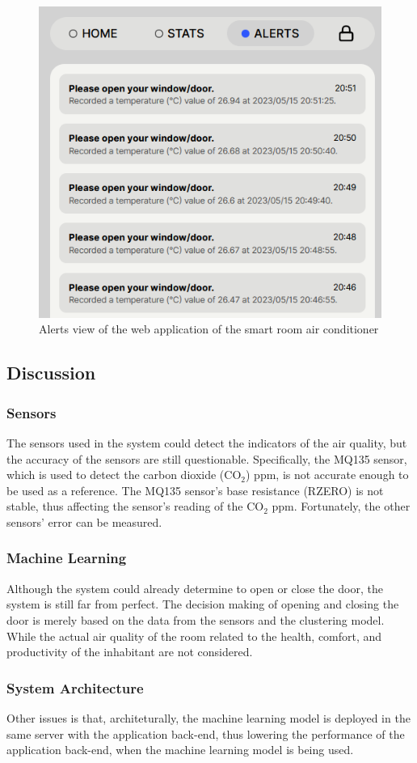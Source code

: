 \begin{figure}
  \centerline{\includegraphics[scale=0.5]{resources/webapp-alerts-view.png}}
  \caption{Alerts view of the web application of the smart room air conditioner}
  \label{webapp-alerts-view}
\end{figure}

\subsection{Discussion}
\subsubsection{Sensors}
The sensors used in the system could detect the
indicators of the air quality, but the accuracy
of the sensors are still questionable.
Specifically, the MQ135 sensor, which is used to
detect the carbon dioxide (CO$_2$) ppm, is not
accurate enough to be used as a reference.
The MQ135 sensor's base resistance (RZERO) is
not stable, thus affecting the sensor's
reading of the CO$_2$ ppm. Fortunately, the other
sensors' error can be measured.

\subsubsection{Machine Learning}
Although the system could already determine to open
or close the door, the system is still far from
perfect. The decision making of opening and closing
the door is merely based on the data from the
sensors and the clustering model. While the actual
air quality of the room related to the health,
comfort, and productivity of the inhabitant are not
considered.

\subsubsection{System Architecture}
Other issues is that, architeturally, the machine
learning model is deployed in the same server with
the application back-end, thus lowering the
performance of the application back-end, when the
machine learning model is being used.
